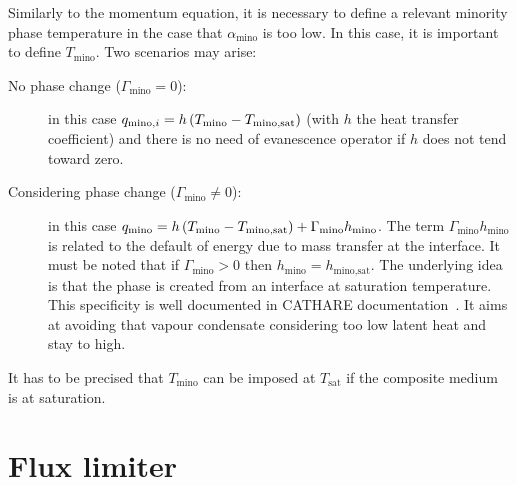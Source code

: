 Similarly to the momentum equation, it is necessary to define a relevant minority phase temperature in the case that $\alpha_{\text{mino}}$ is too low. In this case, it is important to define $T_{\text{mino}}$. Two scenarios may arise:
\begin{description}
    \item[No phase change ($\Gamma_{\text{mino}}=0$):] in this case $q_{\text{mino},i}= h \left( T_{\text{mino}}-T_{\text{mino,sat}} \right)$ (with $h$ the heat transfer coefficient) and there is no need of evanescence operator if $h$ does not tend toward zero.
    \item[Considering phase change ($\Gamma_{\text{mino}} \neq 0$):] in this case $q_{\text{mino}} = h \left( T_{\text{mino}}-T_{\text{mino,sat}} \right) + \Gamma_{\text{mino}} h_{\text{mino}}$. The term $\Gamma_{\text{mino}} h_{\text{mino}}$ is related to the default of energy due to mass transfer at the interface. It must be noted that if $\Gamma_{\text{mino}} > 0$ then $h_{\text{mino}} = h_{\text{mino,sat}}$. The underlying idea is that the phase is created from an interface at saturation temperature. This specificity is well documented in CATHARE documentation~\cite{dummycitation}. It aims at avoiding that vapour condensate considering too low latent heat and stay to high. 
\end{description}
It has to be precised that $T_{\text{mino}}$ can be imposed at $T_{\text{sat}}$ if the composite medium is at saturation.


\section{Flux limiter\label{sec:flux-limiter}} %


